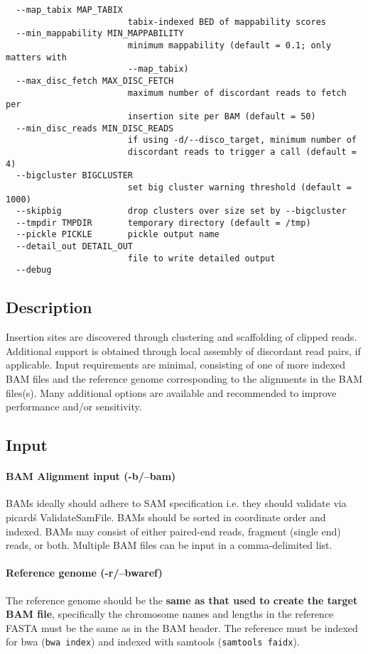 \documentclass[letterpaper,11pt]{article}
\begin{document}
\begin{verbatim}
  --map_tabix MAP_TABIX
                        tabix-indexed BED of mappability scores
  --min_mappability MIN_MAPPABILITY
                        minimum mappability (default = 0.1; only matters with
                        --map_tabix)
  --max_disc_fetch MAX_DISC_FETCH
                        maximum number of discordant reads to fetch per
                        insertion site per BAM (default = 50)
  --min_disc_reads MIN_DISC_READS
                        if using -d/--disco_target, minimum number of
                        discordant reads to trigger a call (default = 4)
  --bigcluster BIGCLUSTER
                        set big cluster warning threshold (default = 1000)
  --skipbig             drop clusters over size set by --bigcluster
  --tmpdir TMPDIR       temporary directory (default = /tmp)
  --pickle PICKLE       pickle output name
  --detail_out DETAIL_OUT
                        file to write detailed output
  --debug
\end{verbatim}

\subsection{Description}
Insertion sites are discovered through clustering and scaffolding of clipped reads. Additional support is obtained through local assembly of discordant read pairs, if applicable. Input requirements are minimal, consisting of one of more indexed BAM files and the reference genome corresponding to the alignments in the BAM files(s). Many additional options are available and recommended to improve performance and/or sensitivity.

\subsection{Input}
\paragraph{BAM Alignment input (-b/--bam)}
	BAMs ideally should adhere to SAM specification i.e. they should validate via picard\'s ValidateSamFile. BAMs should be sorted in coordinate order and indexed. BAMs may consist of either paired-end reads, fragment (single end) reads, or both. Multiple BAM files can be input in a comma-delimited list.
	
\paragraph{Reference genome (-r/--bwaref)}
	The reference genome should be the \textbf{same as that used to create the target BAM file}, specifically the chromosome names and lengths in the reference FASTA must be the same as in the BAM header. The reference must be indexed for bwa (\texttt{bwa index}) and indexed with samtools (\texttt{samtools faidx}).
\end{document}
